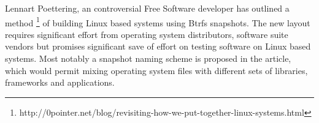 \documentclass[a4paper,11pt]{kth-mag}
\begin{document}
Lennart Poettering, an controversial Free Software developer has outlined a method
\footnote{http://0pointer.net/blog/revisiting-how-we-put-together-linux-systems.html}
of building Linux based systems using Btrfs snapshots.
The new layout requires significant effort from operating system distributors,
software suite vendors but promises significant save of effort on testing
software on Linux based systems.
Most notably a snapshot naming scheme is proposed in the article,
which would permit mixing operating system files with different
sets of libraries, frameworks and applications.


%
%
%
%

\appendix


\clearpage
\twocolumn
\printglossaries
\clearpage
\onecolumn
\end{document}
